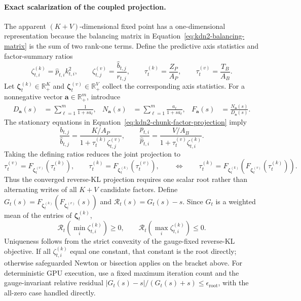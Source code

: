 \documentclass[11pt]{article}
\newcommand{\R}{\mathbb{R}}
\newcommand{\ve}[1]{\boldsymbol{#1}}
\begin{document}
\paragraph{Exact scalarization of the coupled projection.}
The apparent $(K+V)$-dimensional fixed point has a one-dimensional representation because the
balancing matrix in Equation~\eqref{eq:kdn2-balancing-matrix} is the sum of two rank-one terms.
Define the predictive axis statistics and factor-summary ratios
\begin{equation}
  \zeta^{(k)}_{t,i}=\widehat p_{t,i}k_{t,i}^{2},
  \qquad
  \zeta^{(v)}_{t,j}=\frac{\widehat b_{t,j}}{r_{t,j}},
  \qquad
  \tau^{(k)}_t=\frac{Z_P}{A_P},
  \qquad
  \tau^{(v)}_t=\frac{T_B}{A_B}.
  \label{eq:kdn2-chunk-scalar-statistics}
\end{equation}
Let $\ve{\zeta}^{(k)}_t\in\R_+^K$ and
$\ve{\zeta}^{(v)}_t\in\R_+^V$ collect the corresponding axis statistics.
For a nonnegative vector $\ve{a}\in\R_+^m$, introduce
\begin{equation}
\begin{aligned}
  D_{\ve{a}}(s)&=\sum_{\ell=1}^{m}\frac{1}{1+s a_\ell},
  &
  N_{\ve{a}}(s)&=\sum_{\ell=1}^{m}\frac{a_\ell}{1+s a_\ell},
  &
  F_{\ve{a}}(s)&=\frac{N_{\ve{a}}(s)}{D_{\ve{a}}(s)}.
\end{aligned}
  \label{eq:kdn2-chunk-weighted-map}
\end{equation}
The stationary equations in Equation~\eqref{eq:kdn2-chunk-factor-projection} imply
\begin{equation}
  \frac{b_{t,j}}{\widehat b_{t,j}}
  =\frac{K/A_P}{1+\tau^{(k)}_t\zeta^{(v)}_{t,j}},
  \qquad
  \frac{p_{t,i}}{\widehat p_{t,i}}
  =\frac{V/A_B}{1+\tau^{(v)}_t\zeta^{(k)}_{t,i}}.
  \label{eq:kdn2-chunk-factor-ratio-form}
\end{equation}
Taking the defining ratios reduces the joint projection to
\begin{equation}
  \tau^{(v)}_t=F_{\ve{\zeta}^{(v)}_t}(\tau^{(k)}_t),
  \qquad
  \tau^{(k)}_t=F_{\ve{\zeta}^{(k)}_t}(\tau^{(v)}_t),
  \qquad\Longleftrightarrow\qquad
  \tau^{(k)}_t=F_{\ve{\zeta}^{(k)}_t}\!\left(
    F_{\ve{\zeta}^{(v)}_t}(\tau^{(k)}_t)
  \right).
  \label{eq:kdn2-chunk-scalar-root}
\end{equation}
Thus the converged reverse-KL projection requires one scalar root rather than alternating writes
of all $K+V$ candidate factors.  Define
$G_t(s)=F_{\ve{\zeta}^{(k)}_t}(F_{\ve{\zeta}^{(v)}_t}(s))$ and
$\mathcal{R}_t(s)=G_t(s)-s$.  Since $G_t$ is a weighted mean of the entries of
$\ve{\zeta}^{(k)}_t$,
\begin{equation}
  \mathcal{R}_t\!\left(\min_i\zeta^{(k)}_{t,i}\right)\ge0,
  \qquad
  \mathcal{R}_t\!\left(\max_i\zeta^{(k)}_{t,i}\right)\le0.
  \label{eq:kdn2-chunk-scalar-bracket}
\end{equation}
Uniqueness follows from the strict convexity of the gauge-fixed reverse-KL objective.  If all
$\zeta^{(k)}_{t,i}$ equal one constant, that constant is the root directly; otherwise safeguarded
Newton or bisection applies on the bracket above.  For deterministic GPU execution, use a fixed
maximum iteration count and the gauge-invariant relative residual
$|G_t(s)-s|/(G_t(s)+s)\le\epsilon_{\mathrm{root}}$, with the all-zero case handled directly.
\end{document}
